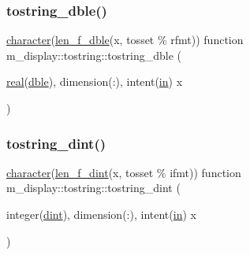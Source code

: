 \subsubsection{\texorpdfstring{tostring\+\_\+dble()}{tostring\_dble()}}
{\footnotesize\ttfamily \hyperlink{option__stopwatch_83_8txt_abd4b21fbbd175834027b5224bfe97e66}{character}(\hyperlink{namespacem__display_aa013a639d5b0f7e40b627c9d712693f0}{len\+\_\+f\+\_\+dble}(x, tosset \% rfmt)) function m\+\_\+display\+::tostring\+::tostring\+\_\+dble (\begin{DoxyParamCaption}\item[{\hyperlink{read__watch_83_8txt_abdb62bde002f38ef75f810d3a905a823}{real}(\hyperlink{namespacem__display_a46d90b75b6ccef7ccade133e5847e815}{dble}), dimension(\+:), intent(\hyperlink{M__journal_83_8txt_afce72651d1eed785a2132bee863b2f38}{in})}]{x }\end{DoxyParamCaption})\hspace{0.3cm}{\ttfamily [private]}}

\mbox{\label{interfacem__display_1_1tostring_aebf0ddff3dd9c09adf462a033836d727}} 
\subsubsection{\texorpdfstring{tostring\+\_\+dint()}{tostring\_dint()}}
{\footnotesize\ttfamily \hyperlink{option__stopwatch_83_8txt_abd4b21fbbd175834027b5224bfe97e66}{character}(\hyperlink{namespacem__display_a6a2709cf5f243ee492f223b40c6b5143}{len\+\_\+f\+\_\+dint}(x, tosset \% ifmt)) function m\+\_\+display\+::tostring\+::tostring\+\_\+dint (\begin{DoxyParamCaption}\item[{integer(\hyperlink{namespacem__display_a73f772e9702cad6f40b78364fde2c7cd}{dint}), dimension(\+:), intent(\hyperlink{M__journal_83_8txt_afce72651d1eed785a2132bee863b2f38}{in})}]{x }\end{DoxyParamCaption})\hspace{0.3cm}{\ttfamily [private]}}

\mbox{\label{interfacem__display_1_1tostring_a0cebd4f420275674ff8cd7b0bed59523}} 
